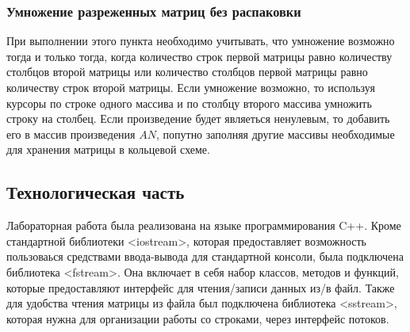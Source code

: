 \documentclass[12pt, a4paper]{article}
\begin{document}
\subsubsection{Умножение разреженных матриц без распаковки}
При выполнении этого пункта необходимо учитывать, что умножение возможно тогда и только тогда, когда количество строк первой матрицы равно количеству столбцов второй матрицы или количество столбцов первой матрицы равно количеству строк второй матрицы. Если умножение возможно, то используя курсоры по строке одного массива и по столбцу второго массива умножить строку на столбец. Если произведение будет являеться ненулевым, то добавить его в массив произведения $AN$, попутно заполняя другие массивы необходимые для хранения матрицы в кольцевой схеме.
\newpage
\begin{center}
    \section{Технологическая часть}
\end{center}

Лабораторная работа была реализована на языке программирования C++. Кроме стандартной библиотеки <iostream>, которая предоставляет возможность пользоваься средствами ввода-вывода для стандартной консоли, была подключена библиотека <fstream>. Она включает в себя набор классов, методов и функций, которые предоставляют интерфейс для чтения/записи данных из/в файл. Также для удобства чтения матрицы из файла был подключена библиотека <sstream>, которая нужна для организации работы со строками, через интерфейс потоков.
\end{document}
